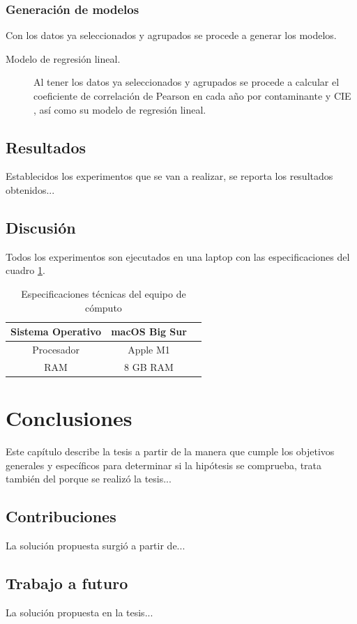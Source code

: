 \subsection{Generación de modelos}
Con los datos ya seleccionados y agrupados se procede a generar los modelos.

\begin{description}
\item [Modelo de regresión lineal.] {Al tener los datos ya seleccionados y agrupados se procede a calcular el coeficiente de correlación de Pearson en cada año por contaminante y CIE \citep{r9}, así como su modelo de regresión lineal}.
\end{description}



\section{Resultados}
Establecidos los experimentos que se van a realizar, se reporta los resultados obtenidos...

\section{Discusión}
Todos los experimentos son ejecutados en una laptop con las especificaciones del cuadro \ref{tab:Especificaciones técnicas del PC}.

\begin{table}[H]
	{\centering
		\caption{Especificaciones técnicas del equipo de cómputo}
		\begin{tabular}{|c|c|c|}
			\hline
			Sistema Operativo & macOS Big Sur\\
			\hline
			Procesador & Apple M1\\
			\hline
			RAM & 8 GB RAM\\
			\hline
		\end{tabular}

	\label{tab:Especificaciones técnicas del PC}
	}
\end{table}

\chapter{Conclusiones}
Este capítulo describe la tesis a partir de la manera que cumple los objetivos generales y específicos para determinar si la hipótesis se comprueba, trata también del porque se realizó la tesis...

\clearpage

\section{Contribuciones}
La solución propuesta surgió a partir de...

\section{Trabajo a futuro}
La solución propuesta en la tesis...